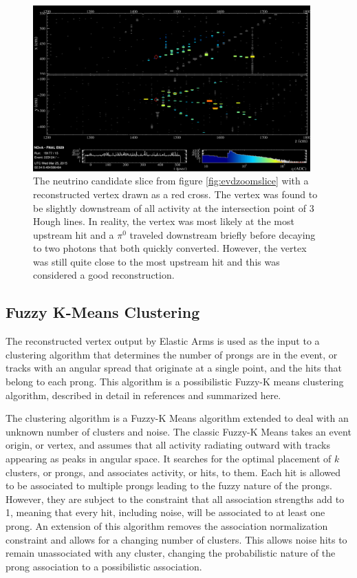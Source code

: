 \begin{figure}[htb]
  \centering
  \includegraphics[width=0.95\textwidth]{figures/evd/ZoomVtx.png}
  \caption[An Example Neutrino Candidate Slice with a Reconstructed Vertex]{The neutrino candidate slice from figure \ref{fig:evdzoomslice} with a reconstructed vertex drawn as a red cross. The vertex was found to be slightly downstream of all activity at the intersection point of $3$ Hough lines. In reality, the vertex was most likely at the most upstream hit and a $\pi^0$ traveled downstream briefly before decaying to two photons that both quickly converted. However, the vertex was still quite close to the most upstream hit and this was considered a good reconstruction.}
  \label{fig:evdVtx}
\end{figure}

\subsection{Fuzzy K-Means Clustering}
\label{sec:RecoFuzzyK}

The reconstructed vertex output by Elastic Arms is used as the input to a clustering algorithm that determines the number of prongs are in the event, or tracks with an angular spread that originate at a single point, and the hits that belong to each prong. This algorithm is a possibilistic Fuzzy-K means clustering algorithm, described in detail in references \cite{ref:TNFuzzyK, ref:ThesisEvan} and summarized here.

The clustering algorithm is a Fuzzy-K Means algorithm extended to deal with an unknown number of clusters and noise. The classic Fuzzy-K Means \cite{ref:RecoFuzzy1, ref:RecoFuzzy2} takes an event origin, or vertex, and assumes that all activity radiating outward with tracks appearing as peaks in angular space. It searches for the optimal placement of $k$ clusters, or prongs, and associates activity, or hits, to them. Each hit is allowed to be associated to multiple prongs leading to the fuzzy nature of the prongs. However, they are subject to the constraint that all association strengths add to 1, meaning that every hit, including noise, will be associated to at least one prong. An extension of this algorithm \cite{ref:RecoFuzzyExt} removes the association normalization constraint and allows for a changing number of clusters. This allows noise hits to remain unassociated with any cluster, changing the probabilistic nature of the prong association to a possibilistic association.

